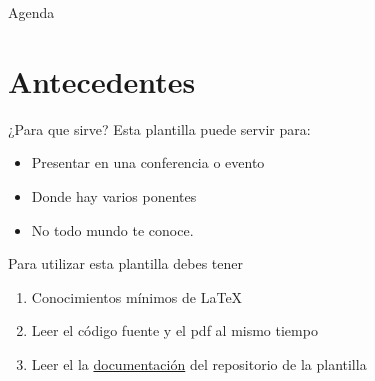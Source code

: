 \begin{frame}{}
    \maketitle
\end{frame}

\begin{frame}{Agenda}
    \begin{multicols}{2}
        \tableofcontents
    \end{multicols}
\end{frame}

\section{Antecedentes}
 \begin{frame}{¿Para que sirve?}
     Esta plantilla puede servir para:
     \begin{itemize}
         \item Presentar en una conferencia o evento
         \item Donde hay varios ponentes
         \item No todo mundo te conoce.
     \end{itemize}
     
     \vspace{0.4cm} %

     Para utilizar esta plantilla debes tener
     \begin{enumerate}
         \item Conocimientos mínimos de \LaTeX{}
         \item Leer el código fuente y el pdf al mismo tiempo
         \item Leer el la \href{https://github.com/nemediano/latexPlantillaUnam/tree/main/Conferencia}{documentación} del repositorio de la plantilla
     \end{enumerate}

     \vspace{0.2cm}

 \end{frame}

